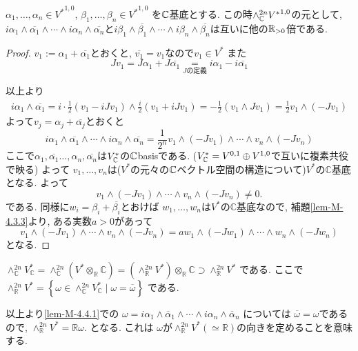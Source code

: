 \begin{tcolorbox}[mybox]
\begin{lem}
\label{lem-M-4.4.1}
$\alpha_1, \ldots, \alpha_n \in {V^{*}}^{1,0}$, $\beta_1, \ldots, \beta_n \in {V^{*}}^{1,0}$
を$\mathbb{C}$基底とする. 
この時$\wedge_{\mathbb{C}}^{2n}{V^{*}}^{1,0}$の元として, 
$i \alpha_1 \wedge \overline{\alpha_1} \wedge \cdots \wedge i \alpha_n\wedge \overline{\alpha_n}$と$i \beta_1 \wedge \overline{\beta_1} \wedge \cdots \wedge i \beta_n\wedge \overline{\beta_n}$は互いに他の$\mathbb{R}_{>0}$倍である. 
\end{lem}
\end{tcolorbox}
\begin{proof}
$v_1 := \alpha_1 + \overline{\alpha_1}$とおくと, 
$\overline{v_1}=v_1$なので$v_1 \in V^{*}$
また
$$
Jv_1=J\alpha_1 + J\overline{\alpha_1}\underset{\text{$J$の定義}}{=}
i\alpha_1 - i \overline{\alpha_1}
$$

以上より
\begin{align*}
i \alpha_1 \wedge \overline{\alpha_1}
=
i \cdot \frac{1}{2}(v_1 - i J v_1) 
\wedge \frac{i}{2}(v_1 + i J v_1) 
=
-\frac{1}{2}(v_1\wedge J v_1)
=
\frac{1}{2}v_1\wedge (-J v_1)
\end{align*}
よって$v_j = \alpha_j + \overline{\alpha_j}$とおくと
$$
i \alpha_1 \wedge \overline{\alpha_1} \wedge \cdots \wedge i \alpha_n\wedge \overline{\alpha_n}
= \frac{1}{2^n}
v_1\wedge (-J v_1) 
\wedge \cdots \wedge
v_n\wedge (-J v_n) 
$$
ここで$\alpha_1, \overline{\alpha_1}\ldots, \alpha_n, \overline{\alpha_n}$は$V_{\mathbb{C}}^{*}$の$\mathbb{C}$basisである. ($V_{\mathbb{C}}^{*}=V^{0,1}\oplus V^{1,0}$で互いに複素共役で映る)
よって
\(v_1,\ldots,v_n\)は($V^*$の元々の$\mathbb{C}$ベクトル空間の構造について)$V^*$の$ \mathbb{C}$基底となる.
よって
\[
v_1\wedge(-Jv_1)\wedge\cdots\wedge v_n\wedge(-Jv_n)\ne 0.
\]
である. 
同様に$w_i = \beta_i + \overline{\beta_i}$とおけば
\(w_1,\ldots,w_n\)は$V^*$の$\mathbb{C}$基底なので, 
補題\ref{lem-M-4.3.3}より, ある実数$a > 0$があって
\[
v_1\wedge(-Jv_1)\wedge\cdots\wedge v_n\wedge(-Jv_n)
=
aw_1\wedge(-Jw_1)\wedge\cdots\wedge w_n\wedge(-Jw_n)
\]
となる. 
\end{proof}

\begin{rem}
\(
\wedge_{\mathbb{C}}^{2n}V_{\mathbb{C}}^*
=
\wedge_{\mathbb{C}}^{2n}(V^*\otimes_{\mathbb{R}}\mathbb{C})
=
(\wedge_{\mathbb{R}}^{2n}V^*)\otimes_{\mathbb{R}}\mathbb{C}
\supset \wedge_{\mathbb{R}}^{2n}V^*
\)
である. 
ここで
\(
\wedge_{\mathbb{R}}^{2n}V^*
=
\left\{
\omega\in\wedge_{\mathbb{C}}^{2n}V_{\mathbb{C}}^*
\mid
\omega=\overline{\omega}
\right\}
\)
である.

以上より\ref{lem-M-4.4.1}での
\(
\omega
=
i\alpha_1\wedge\overline{\alpha}_1\wedge\cdots\wedge i\alpha_n\wedge\overline{\alpha}_n
\)
については
\(\overline{\omega}=\omega\)であるので, 
\(
\wedge_{\mathbb{R}}^{2n}V^*=\mathbb{R}\omega.
\)
となる. これは
$\omega$が$\wedge_{\mathbb{R}}^{2n}V^*(\simeq\mathbb{R})$の向きを定めることを意味する.

\end{rem}





